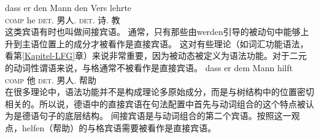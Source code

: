 \ex 
\gll dass er den Mann den Vers lehrte\\
	 \textsc{comp} he \textsc{det}.\acc{} 男人.\acc{} \textsc{det}.\acc{} 诗.\acc{} 教\\
\zl
这类宾语有时也叫做间接宾语。
通常，只有那些由werden引导的被动句中能够上升到主语位置上的成分才被看作是直接宾语。
这对有些理论（如词汇功能语法，看第\ref{Kapitel-LFG}章）来说非常重要，因为被动态被定义为语法功能。对于二元的动词性谓语来说，与格通常不被看作是直接宾语\citep{Cook2006a-u}。
\ea
\gll dass er dem Mann hilft\\
     \textsc{comp} 他 \textsc{det}.\dat{} 男人.\dat{} 帮助\\
\z
在很多理论中，语法功能并不是构成理论多原始成分，而是与树结构中的位置密切相关的。所以说，德语中的直接宾语在句法配置中首先与动词组合的这个特点被认为是德语句子的底层结构。
间接宾语是与动词组合的第二个宾语。按照这一观点，helfen（帮助）的与格宾语需要被看作是直接宾语。

